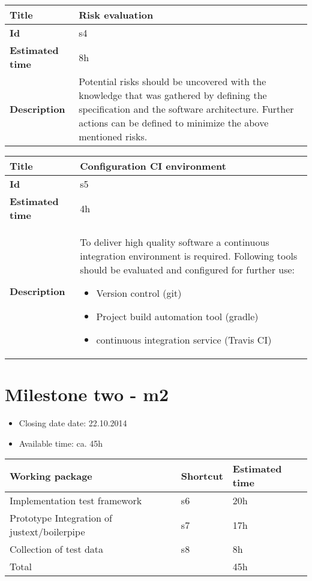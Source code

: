     \begin{tabular}{ | p{4cm} | p{10cm} |}
    \hline
    \textbf{Title} & Risk evaluation\\ \hline
    \textbf{Id} & s4\\ \hline
    \textbf{Estimated time} & 8h \\ \hline
    \textbf{Description} & Potential risks should be uncovered with the knowledge that was gathered by defining the specification and the software architecture. Further actions can be defined to minimize the above mentioned risks.\\
    \hline
    \end{tabular}
    

    \begin{tabular}{ | p{4cm} | p{10cm} |}
    \hline
    \textbf{Title} & Configuration CI environment\\ \hline
    \textbf{Id} & s5\\ \hline
    \textbf{Estimated time} & 4h \\ \hline
    \textbf{Description} & To deliver high quality software a continuous integration environment is required. Following tools should be evaluated and configured for further use:
    \begin{itemize}
        \item Version control (git)
        \item Project build automation tool (gradle)
        \item continuous integration service (Travis CI)
    \end{itemize}
    \\
    \hline
    \end{tabular}


\section{Milestone two - m2}

\begin{itemize}
\item Closing date date: 22.10.2014
\item Available time: ca. 45h
\end{itemize}

    \begin{tabular}{ | p{10cm} | p{2cm} | p{2cm} |}
    \hline
    \textbf{Working package} & \textbf{Shortcut}& \textbf{Estimated time} \\ \hline
    Implementation test framework & s6 & 20h \\
    Prototype Integration of justext/boilerpipe & s7 & 17h \\
    Collection of test data & s8 & 8h \\ \hline
    Total &  & 45h\\
    \hline
    \end{tabular}


